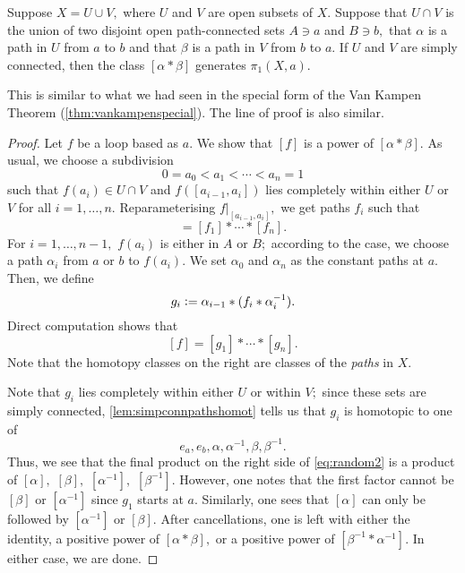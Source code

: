 \documentclass[12pt]{article}
\begin{document}
\begin{thm} \label{thm:distortedvankamp}
 	Suppose $X = U \cup V,$ where $U$ and $V$ are open subsets of $X.$ Suppose that $U \cap V$ is the union of two disjoint open path-connected sets $A \ni a$ and $B \ni b,$ that $\alpha$ is a path in $U$ from $a$ to $b$ and that $\beta$ is a path in $V$ from $b$ to $a.$ If $U$ and $V$ are simply connected, then the class $[\alpha*\beta]$ generates $\pi_1(X,a).$
\end{thm} 
This is similar to what we had seen in the special form of the Van Kampen Theorem (\cref{thm:vankampenspecial}). The line of proof is also similar.
\begin{proof} 
	Let $f$ be a loop based as $a.$ We show that $[f]$ is a power of $[\alpha*\beta].$ As usual, we choose a subdivision
	\begin{equation*} 
		0 = a_0 < a_1 < \cdots < a_n = 1
	\end{equation*}
	such that $f(a_i) \in U \cap V$ and $f([a_{i-1}, a_i])$ lies completely within either $U$ or $V$ for all $i = 1, \ldots, n.$ Reparameterising $f|_{[a_{i-1}, a_i]},$ we get paths $f_i$ such that
	\begin{equation*} 
		[f] = [f_1]*\cdots*[f_n].
	\end{equation*}
	For $i = 1, \ldots, n - 1,$ $f(a_i)$ is either in $A$ or $B;$ according to the case, we choose a path $\alpha_i$ from $a$ or $b$ to $f(a_i).$ We set $\alpha_0$ and $\alpha_n$ as the constant paths at $a.$ Then, we define
	\begin{equation*} 
		g_i \vcentcolon= \alpha_{i-1} * (f_i * \alpha_i^{-1}).
	\end{equation*}
	Direct computation shows that
	\begin{equation} \tag{$*$} \label{eq:random2}
		[f] = [g_1]*\cdots*[g_n]. 
	\end{equation}
	Note that the homotopy classes on the right are classes of the \emph{paths} in $X.$

	Note that $g_i$ lies completely within either $U$ or within $V;$ since these sets are simply connected, \cref{lem:simpconnpathshomot} tells us that $g_i$ is homotopic to one of
	\begin{equation*} 
		e_a, e_b, \alpha, \alpha^{-1}, \beta, \beta^{-1}.
	\end{equation*}
	Thus, we see that the final product on the right side of \cref{eq:random2} is a product of $[\alpha],$ $[\beta],$ $[\alpha^{-1}],$ $[\beta^{-1}].$ However, one notes that the first factor cannot be $[\beta]$ or $[\alpha^{-1}]$ since $g_1$ starts at $a.$ Similarly, one sees that $[\alpha]$ can only be followed by $[\alpha^{-1}]$ or $[\beta].$ After cancellations, one is left with either the identity, a positive power of $[\alpha*\beta],$ or a positive power of $[\beta^{-1}*\alpha^{-1}].$ In either case, we are done.
\end{proof}
\end{document}
